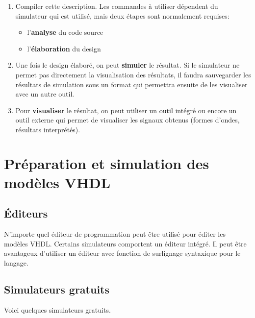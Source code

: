 \documentclass[letter, oneside]{book}
\begin{document}
\begin{enumerate}
\item Compiler cette description. Les commandes à utiliser dépendent du
simulateur qui est utilisé, mais deux étapes sont normalement
requises:
\begin{itemize}
\item l'\textbf{analyse} du code source
\item l'\textbf{élaboration} du design
\end{itemize}

\item Une fois le design élaboré, on peut \textbf{simuler} le résultat. Si le
simulateur ne permet pas directement la visualisation des
résultats, il faudra sauvegarder les résultats de simulation sous un
format qui permettra ensuite de les visualiser avec un autre outil.

\item Pour \textbf{visualiser} le résultat, on peut utiliser un outil intégré ou encore un
outil externe qui permet de visualiser les signaux obtenus (formes d'ondes,
résultats interprétés).
\end{enumerate}

\chapter{Préparation et simulation des modèles VHDL}
\label{sec:org1460e2b}

\section{Éditeurs}
\label{sec:orgb194a3c}

N'importe quel éditeur de programmation peut être utilisé pour éditer
les modèles VHDL. Certains simulateurs comportent un éditeur
intégré. Il peut être avantageux d'utiliser un éditeur avec fonction
de surlignage syntaxique pour le langage.

\section{Simulateurs gratuits}
\label{sec:orga09be9a}

Voici quelques simulateurs gratuits. 
\end{document}
